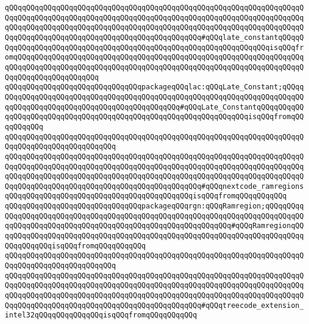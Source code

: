 \verb|qQQqqQQqqQQqqQQqqQQqqQQqqQQqqQQqqQQqqQQqqQQqqQQqqQQqqQQqqQQqqQQqqQQqqQQqqQQqqQQqqQQqqQQqqQQqqQQqqQQqqQQqqQQqqQQqqQQqqQQqqQQqqQQqqQQqqQQqqQQqqQQqqQQqqQQqqQQqqQQqqQQqqQQqqQQqqQQqqQQqqQQqqQQqqQQqqQQqqQQqqQQqqQQqqQQqqQQqqQQqqQQqqQQqqQQqqQQqqQQqqQQqqQQqqQQqqQQq#qQQqlate_constantqQQqqQQqqQQqqQQqqQQqqQQqqQQqqQQqqQQqqQQqqQQqqQQqqQQqqQQqqQQqqQQqqQQqisqQQqfromqQQqqQQqqQQq|\verb|qQQqqQQqqQQqqQQqqQQqqQQqqQQqqQQqqQQqqQQqqQQqqQQqqQQqqQQqqQQqqQQqqQQqqQQqqQQqqQQqqQQqqQQqqQQqqQQqqQQqqQQqqQQqqQQqqQQqqQQqqQQqqQQqqQQqqQQqqQQqqQQqqQQq|\newline
\verb|qQQqqQQqqQQqqQQqqQQqqQQqqQQqqQQqpackageqQQqlac:qQQqLate_Constant;qQQqqQQqqQQqqQQqqQQqqQQqqQQqqQQqqQQqqQQqqQQqqQQqqQQqqQQqqQQqqQQqqQQqqQQqqQQqqQQqqQQqqQQqqQQqqQQqqQQqqQQqqQQqqQQqqQQq#qQQqLate_ConstantqQQqqQQqqQQqqQQqqQQqqQQqqQQqqQQqqQQqqQQqqQQqqQQqqQQqqQQqqQQqqQQqqQQqisqQQqfromqQQqqQQqqQQq|\newline
\verb|qQQqqQQqqQQqqQQqqQQqqQQqqQQqqQQqqQQqqQQqqQQqqQQqqQQqqQQqqQQqqQQqqQQqqQQqqQQqqQQqqQQqqQQqqQQqqQQq|\newline
\verb|qQQqqQQqqQQqqQQqqQQqqQQqqQQqqQQqqQQqqQQqqQQqqQQqqQQqqQQqqQQqqQQqqQQqqQQqqQQqqQQqqQQqqQQqqQQqqQQqqQQqqQQqqQQqqQQqqQQqqQQqqQQqqQQqqQQqqQQqqQQqqQQqqQQqqQQqqQQqqQQqqQQqqQQqqQQqqQQqqQQqqQQqqQQqqQQqqQQqqQQqqQQqqQQqqQQqqQQqqQQqqQQqqQQqqQQqqQQqqQQqqQQqqQQqqQQqqQQq#qQQqnextcode_ramregionsqQQqqQQqqQQqqQQqqQQqqQQqqQQqqQQqqQQqqQQqqQQqisqQQqfromqQQqqQQqqQQq|\newline
\verb|qQQqqQQqqQQqqQQqqQQqqQQqqQQqqQQqpackageqQQqrgn:qQQqRamregion;qQQqqQQqqQQqqQQqqQQqqQQqqQQqqQQqqQQqqQQqqQQqqQQqqQQqqQQqqQQqqQQqqQQqqQQqqQQqqQQqqQQqqQQqqQQqqQQqqQQqqQQqqQQqqQQqqQQqqQQqqQQqqQQqqQQq#qQQqRamregionqQQqqQQqqQQqqQQqqQQqqQQqqQQqqQQqqQQqqQQqqQQqqQQqqQQqqQQqqQQqqQQqqQQqqQQqqQQqqQQqqQQqisqQQqfromqQQqqQQqqQQq|\newline
\verb|qQQqqQQqqQQqqQQqqQQqqQQqqQQqqQQqqQQqqQQqqQQqqQQqqQQqqQQqqQQqqQQqqQQqqQQqqQQqqQQqqQQqqQQqqQQqqQQq|\newline
\newline
\verb|qQQqqQQqqQQqqQQqqQQqqQQqqQQqqQQqqQQqqQQqqQQqqQQqqQQqqQQqqQQqqQQqqQQqqQQqqQQqqQQqqQQqqQQqqQQqqQQqqQQqqQQqqQQqqQQqqQQqqQQqqQQqqQQqqQQqqQQqqQQqqQQqqQQqqQQqqQQqqQQqqQQqqQQqqQQqqQQqqQQqqQQqqQQqqQQqqQQqqQQqqQQqqQQqqQQqqQQqqQQqqQQqqQQqqQQqqQQqqQQqqQQqqQQqqQQqqQQq#qQQqtreecode_extension_intel32qQQqqQQqqQQqqQQqisqQQqfromqQQqqQQqqQQq|\newline
